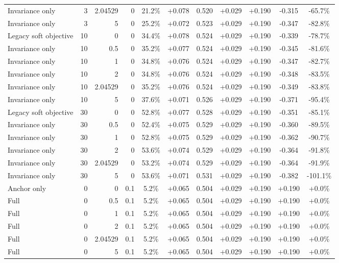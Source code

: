 \begin{table}[htbp]
\begin{tabular}{lrrrccccccc}
Invariance only & 3 & 2.04529 & 0 & 21.2\% & +0.078 & 0.520 & +0.029 & +0.190 & -0.315 & -65.7\% \\
Invariance only & 3 & 5 & 0 & 25.2\% & +0.072 & 0.523 & +0.029 & +0.190 & -0.347 & -82.8\% \\
Legacy soft objective & 10 & 0 & 0 & 34.4\% & +0.078 & 0.524 & +0.029 & +0.190 & -0.339 & -78.7\% \\
Invariance only & 10 & 0.5 & 0 & 35.2\% & +0.077 & 0.524 & +0.029 & +0.190 & -0.345 & -81.6\% \\
Invariance only & 10 & 1 & 0 & 34.8\% & +0.076 & 0.524 & +0.029 & +0.190 & -0.347 & -82.7\% \\
Invariance only & 10 & 2 & 0 & 34.8\% & +0.076 & 0.524 & +0.029 & +0.190 & -0.348 & -83.5\% \\
Invariance only & 10 & 2.04529 & 0 & 35.2\% & +0.076 & 0.524 & +0.029 & +0.190 & -0.349 & -83.8\% \\
Invariance only & 10 & 5 & 0 & 37.6\% & +0.071 & 0.526 & +0.029 & +0.190 & -0.371 & -95.4\% \\
Legacy soft objective & 30 & 0 & 0 & 52.8\% & +0.077 & 0.528 & +0.029 & +0.190 & -0.351 & -85.1\% \\
Invariance only & 30 & 0.5 & 0 & 52.4\% & +0.075 & 0.529 & +0.029 & +0.190 & -0.360 & -89.5\% \\
Invariance only & 30 & 1 & 0 & 52.8\% & +0.075 & 0.529 & +0.029 & +0.190 & -0.362 & -90.7\% \\
Invariance only & 30 & 2 & 0 & 53.6\% & +0.074 & 0.529 & +0.029 & +0.190 & -0.364 & -91.8\% \\
Invariance only & 30 & 2.04529 & 0 & 53.2\% & +0.074 & 0.529 & +0.029 & +0.190 & -0.364 & -91.9\% \\
Invariance only & 30 & 5 & 0 & 53.6\% & +0.071 & 0.531 & +0.029 & +0.190 & -0.382 & -101.1\% \\
Anchor only & 0 & 0 & 0.1 & 5.2\% & +0.065 & 0.504 & +0.029 & +0.190 & +0.190 & +0.0\% \\
Full & 0 & 0.5 & 0.1 & 5.2\% & +0.065 & 0.504 & +0.029 & +0.190 & +0.190 & +0.0\% \\
Full & 0 & 1 & 0.1 & 5.2\% & +0.065 & 0.504 & +0.029 & +0.190 & +0.190 & +0.0\% \\
Full & 0 & 2 & 0.1 & 5.2\% & +0.065 & 0.504 & +0.029 & +0.190 & +0.190 & +0.0\% \\
Full & 0 & 2.04529 & 0.1 & 5.2\% & +0.065 & 0.504 & +0.029 & +0.190 & +0.190 & +0.0\% \\
Full & 0 & 5 & 0.1 & 5.2\% & +0.065 & 0.504 & +0.029 & +0.190 & +0.190 & +0.0\% \\

\end{tabular}
\end{table}
